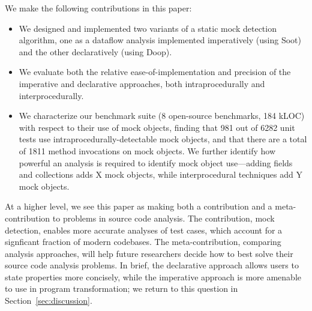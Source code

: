 We make the following contributions in this paper:
\begin{itemize}
\item We designed and implemented two variants of a static mock detection algorithm, one as a dataflow analysis implemented imperatively (using Soot) and the other declaratively (using Doop).
\item We evaluate both the relative ease-of-implementation and precision of the imperative and declarative approaches, both intraprocedurally and interprocedurally. %
\item We characterize our benchmark suite (8 open-source benchmarks, 184 kLOC) with respect to their use of mock objects, finding that 981 out of 6282 unit tests use intraprocedurally-detectable mock objects, and that there are a total of 1811 method invocations on mock objects. We further identify how powerful an analysis is required to identify mock object use---adding fields and collections adds X mock objects, while interprocedural techniques add Y mock objects.
\end{itemize}
At a higher level, we see this paper as making both a contribution and a meta-contribution to
problems in source code analysis. The contribution, mock detection, enables more accurate analyses
of test cases, which account for a signficant fraction of modern codebases. The meta-contribution,
comparing analysis approaches, will help future researchers decide how to best solve their
source code analysis problems. In brief, the declarative approach allows users to state properties more
concisely, while the imperative approach is more amenable to use in program transformation; we return
to this question in Section~\ref{sec:discussion}.
